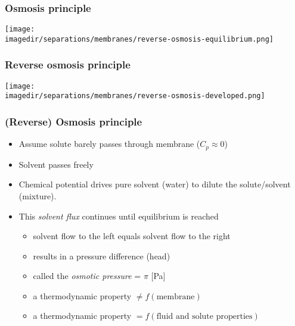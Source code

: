 \begin{frame}\frametitle{Osmosis principle}
	\vfill
	\begin{center}
		\texttt{[image: \\imagedir/separations/membranes/reverse-osmosis-equilibrium.png]}
	\end{center}
\end{frame}

\begin{frame}\frametitle{\textbf{{\color{myOrange}Reverse}} osmosis principle}
	\vfill
	\begin{center}
		\texttt{[image: \\imagedir/separations/membranes/reverse-osmosis-developed.png]}
	\end{center}
\end{frame}

\begin{frame}\frametitle{(Reverse) Osmosis principle}
	\begin{itemize}
		\item	Assume solute barely passes through membrane ($C_p \approx 0$)
		\item	Solvent passes freely
		\item	Chemical potential drives pure solvent (water) to dilute the solute/solvent (mixture).
		\item	This \emph{solvent flux} continues until equilibrium is reached
			\begin{itemize}
				\item	solvent flow to the left equals solvent flow to the right
				\item	results in a pressure difference (head)
				\item	called the \emph{osmotic pressure} = $\pi$ [Pa]
				\item	a thermodynamic property $\neq f(\text{membrane})$
				\item	a thermodynamic property $= f(\text{fluid and solute properties})$
			\end{itemize}
	\end{itemize}
\end{frame}

